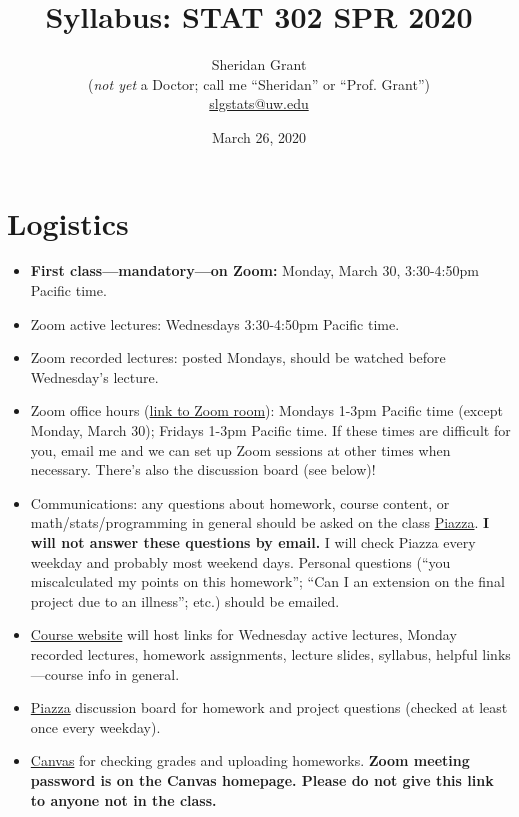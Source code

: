 \documentclass[12pt]{article}
\title{Syllabus: STAT 302 SPR 2020}
\author{Sheridan Grant\\(\textit{not yet} a Doctor; call me ``Sheridan'' or ``Prof. Grant'')\\\href{mailto:slgstats@uw.edu}{slgstats@uw.edu}}
\date{March 26, 2020}
\begin{document}
\sloppy

\maketitle

\section*{Logistics}

\begin{itemize}
	\item \textbf{First class---mandatory---on Zoom:} Monday, March 30, 3:30-4:50pm Pacific time.
	\item Zoom active lectures: Wednesdays 3:30-4:50pm Pacific time.
	\item Zoom recorded lectures: posted Mondays, should be watched before Wednesday's lecture.
	\item Zoom office hours (\href{https://washington.zoom.us/j/7876861762?pwd=Nld6U2cvMWlUOVJUZ1B1UWVUbkFBQT09}{link to Zoom room}): Mondays 1-3pm Pacific time (except Monday, March 30); Fridays 1-3pm Pacific time. If these times are difficult for you, email me and we can set up Zoom sessions at other times when necessary. There's also the discussion board (see below)!
	\item Communications: any questions about homework, course content, or math/stats/programming in general should be asked on the class \href{https://piazza.com/washington/spring2020/stat302}{Piazza}. \textbf{I will not answer these questions by email.} I will check Piazza every weekday and probably most weekend days. Personal questions (``you miscalculated my points on this homework''; ``Can I an extension on the final project due to an illness''; etc.) should be emailed.
	\item \href{https://sheridanlgrant.github.io/teaching/STAT302_SPR2020}{Course website} will host links for Wednesday active lectures, Monday recorded lectures, homework assignments, lecture slides, syllabus, helpful links---course info in general.
	\item \href{https://piazza.com/washington/spring2020/stat302}{Piazza} discussion board for homework and project questions (checked at least once every weekday).
	\item \href{https://canvas.uw.edu/}{Canvas} for checking grades and uploading homeworks. \textbf{Zoom meeting password is on the Canvas homepage. Please do not give this link to anyone not in the class.}
\end{itemize}
\end{document}
